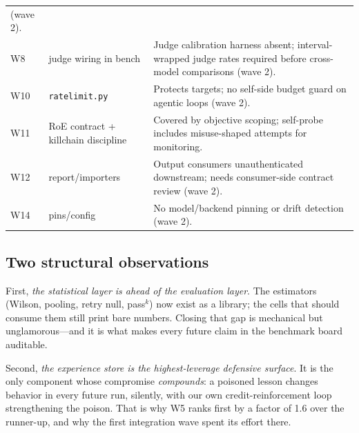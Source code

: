 \begin{longtable}{L{1.0cm} L{4.2cm} L{8.2cm}}
(wave 2). \\
W8 & judge wiring in bench & Judge calibration harness absent; interval-wrapped
judge rates required before cross-model comparisons (wave 2). \\
W10 & \texttt{ratelimit.py} & Protects targets; no self-side budget guard on
agentic loops (wave 2). \\
W11 & RoE contract + killchain discipline & Covered by objective scoping;
self-probe includes misuse-shaped attempts for monitoring. \\
W12 & report/importers & Output consumers unauthenticated downstream; needs
consumer-side contract review (wave 2). \\
W14 & pins/config & No model/backend pinning or drift detection (wave 2). \\
\end{longtable}

\subsection{Two structural observations}\label{sec:observations}

First, \emph{the statistical layer is ahead of the evaluation layer}. The
estimators (Wilson, pooling, retry null, pass$^k$) now exist as a library; the
cells that should consume them still print bare numbers. Closing that gap is
mechanical but unglamorous---and it is what makes every future claim in the
benchmark board auditable.

Second, \emph{the experience store is the highest-leverage defensive surface}.
It is the only component whose compromise \emph{compounds}: a poisoned lesson
changes behavior in every future run, silently, with our own credit-reinforcement
loop strengthening the poison. That is why W5 ranks first by a factor of 1.6
over the runner-up, and why the first integration wave spent its effort there.
